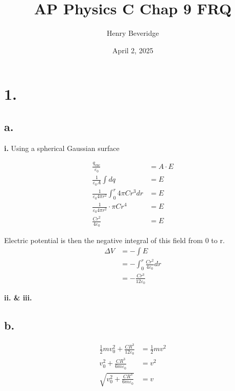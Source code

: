 \documentclass{article}
\title{AP Physics C Chap 9 FRQ}
\author{Henry Beveridge}
\date{April 2, 2025}
\begin{document}
\maketitle

\section*{1.}
\subsection*{a.}
\textbf{i.} Using a spherical Gaussian surface

\begin{align*}
    \frac{q_\text{enc}}{\varepsilon_0} &= A\cdot E \\
    \frac{1}{\varepsilon_0 A} \int dq &= E \\
    \frac{1}{\varepsilon_0 4\pi r^2} \int_0^r 4\pi Cr^3 dr &= E \\
    \frac{1}{\varepsilon_0 4\pi r^2} \cdot \pi Cr^4 &= E \\
    \frac{Cr^2}{4\varepsilon_0} &= E
\end{align*}

Electric potential is then the negative integral of this field from 0 to r.
\begin{align*}
    \Delta V &= -\int E \\
    &= -\int_0^r \frac{Cr^2}{4\varepsilon_0} dr \\
    &= -\frac{Cr^3}{12\varepsilon_0}
\end{align*}

\noindent \textbf{ii. \& iii.}
\begin{center}
\end{center}

\subsection*{b.}
\begin{align*}
  \frac{1}{2}mv_0^2 + \frac{CR^3}{12\varepsilon_0}&= \frac{1}{2}mv^2 \\
  v_0^2 + \frac{CR^3}{6m\varepsilon_0}&= v^2 \\
  \sqrt{v_0^2 + \frac{CR^3}{6m\varepsilon_0}}&= v
\end{align*}
\end{document}
